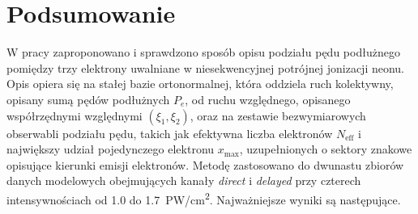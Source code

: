 \documentclass[12pt,a4paper]{article}
\newcommand{\Neff}{N_{\mathrm{eff}}}
\newcommand{\xmax}{x_{\max}}
\newcommand{\PWcm}{PW/cm\textsuperscript{2}}
\begin{document}
\section{Podsumowanie}
W pracy zaproponowano i sprawdzono sposób opisu podziału pędu
podłużnego pomiędzy trzy elektrony uwalniane w niesekwencyjnej
potrójnej jonizacji neonu. Opis opiera się na stałej bazie
ortonormalnej, która oddziela ruch kolektywny, opisany sumą pędów podłużnych $P_e$, od ruchu względnego, opisanego współrzędnymi względnymi $(\xi_1,\xi_2)$, oraz na zestawie bezwymiarowych obserwabli
podziału pędu, takich jak efektywna liczba elektronów $\Neff$ i największy
udział pojedynczego elektronu $\xmax$, uzupełnionych o sektory znakowe
opisujące kierunki emisji elektronów. Metodę zastosowano do dwunastu zbiorów danych
modelowych obejmujących kanały \emph{direct} i \emph{delayed} przy
czterech intensywnościach od \num{1.0} do \num{1.7}~\PWcm.
Najważniejsze wyniki są następujące.
\end{document}
